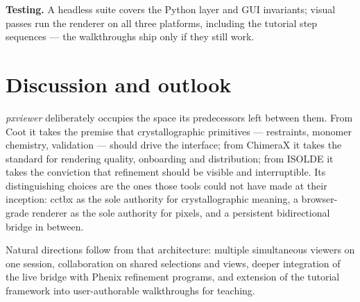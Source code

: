 \documentclass[11pt]{article}
\newcommand{\pxviewer}{\emph{pxviewer}}
\begin{document}
\textbf{Testing.} A headless suite covers the Python layer and GUI
invariants; visual passes run the renderer on all three platforms, including
the tutorial step sequences --- the walkthroughs ship only if they still
work.

\section{Discussion and outlook}

\pxviewer{} deliberately occupies the space its predecessors left between
them. From Coot it takes the premise that crystallographic primitives ---
restraints, monomer chemistry, validation --- should drive the interface;
from ChimeraX it takes the standard for rendering quality, onboarding and
distribution; from ISOLDE it takes the conviction that refinement should be
visible and interruptible. Its distinguishing choices are the ones those
tools could not have made at their inception: cctbx as the sole authority
for crystallographic meaning, a browser-grade renderer as the sole
authority for pixels, and a persistent bidirectional bridge in between.

Natural directions follow from that architecture: multiple simultaneous
viewers on one session, collaboration on shared selections and views,
deeper integration of the live bridge with Phenix refinement programs, and
extension of the tutorial framework into user-authorable walkthroughs for
teaching.

\end{document}

